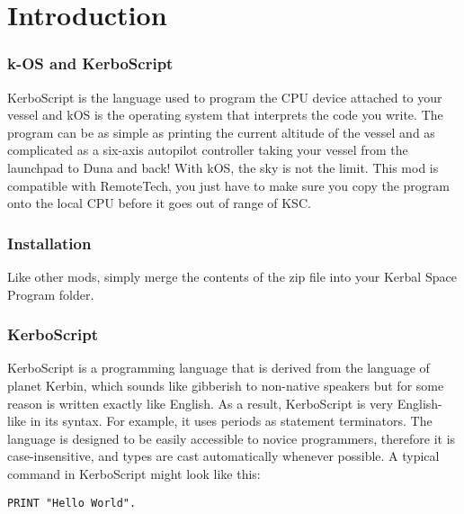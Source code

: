 \part{Introduction}
	\section*{k-OS and KerboScript}
		KerboScript is the language used to program the CPU device attached to your vessel and kOS is the operating system that interprets the code you write. The program can be as simple as printing the current altitude of the vessel and as complicated as a six-axis autopilot controller taking your vessel from the launchpad to Duna and back! With kOS, the sky is not the limit.
		This mod is compatible with RemoteTech, you just have to make sure you copy the program onto the local CPU before it goes out of range of KSC.
	\section*{Installation}
		Like other mods, simply merge the contents of the zip file into your Kerbal Space Program folder.
	\section*{KerboScript}
		KerboScript is a programming language that is derived from the language of planet Kerbin, which sounds like gibberish to non-native speakers but for some reason is written exactly like English. As a result, KerboScript is very English-like in its syntax. For example, it uses periods as statement terminators.
		The language is designed to be easily accessible to novice programmers, therefore it is case-insensitive, and types are cast automatically whenever possible.
		A typical command in KerboScript might look like this:
					
\begin{Verbatim}[frame=single]
PRINT "Hello World".
\end{Verbatim} 
